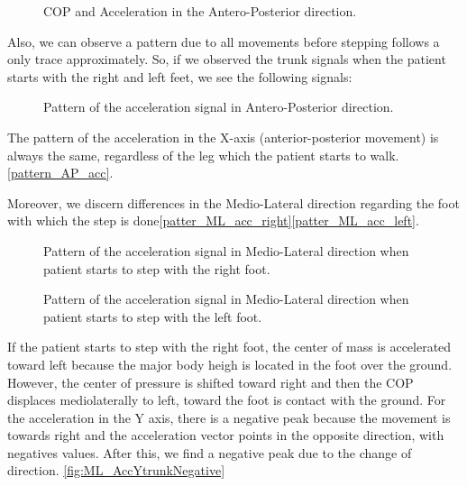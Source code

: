 \begin{figure}[H]
	\centering
	\caption{COP and Acceleration in the Antero-Posterior direction.}
	\label{fig:AP_AccXtrunk}
\end{figure}

Also, we can observe a pattern due to all movements before stepping follows a only trace approximately. So, if we observed the trunk signals when the patient starts with the right and left feet, we see the following signals:

\begin{figure}[H]
	\centering
	\caption{Pattern of the acceleration signal in Antero-Posterior direction.}
	\label{fig:pattern_AP_acc}
\end{figure}

The pattern of the acceleration in the X-axis (anterior-posterior movement) is always the same, regardless of the leg which the patient starts to walk. \ref{pattern_AP_acc}.

Moreover, we discern differences in the Medio-Lateral direction regarding the foot with which the step is done\ref{patter_ML_acc_right}\ref{patter_ML_acc_left}. 

\begin{figure}[H]
	\centering
	\caption{Pattern of the acceleration signal in Medio-Lateral direction when patient starts to step with the right foot.}
	\label{fig:pattern_ML_acc_right}
\end{figure}

\begin{figure}[H]
	\centering
	\caption{Pattern of the acceleration signal in Medio-Lateral direction when patient starts to step with the left foot.}
	\label{fig:pattern_ML_acc_left}
\end{figure}

If the patient starts to step with the right foot, the center of mass is accelerated toward left because the major body heigh is located in the foot over the ground. However, the center of pressure is shifted toward right and then the COP displaces mediolaterally to left, toward the foot is contact with the ground. For the acceleration in the Y axis, there is a negative peak because the movement is towards right and the acceleration vector points in the opposite direction, with negatives values. After this, we find a negative peak due to the change of direction. \ref{fig:ML_AccYtrunkNegative}

